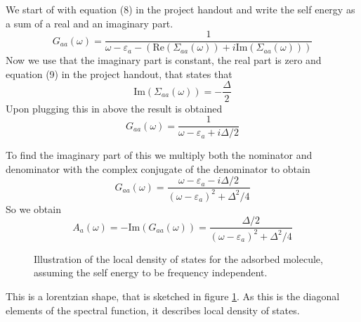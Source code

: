 \begin{solution}
We start of with equation (8) in the project handout and write the self energy as a sum of a real and an imaginary part.
\begin{equation}
    G_{aa}(\omega) = \frac{1}{\omega - \varepsilon_a-(\mathrm{Re}(\Sigma_{aa}(\omega)) + i \mathrm{Im}(\Sigma_{aa}(\omega)))}
\end{equation}
Now we use that the imaginary part is constant, the real part is zero and equation (9) in the project handout, that states that
\begin{equation}
    \mathrm{Im}(\Sigma_{aa}(\omega)) = -\frac{\Delta}{2}
\end{equation}
Upon plugging this in above the result is obtained
\begin{equation}
        G_{aa}(\omega) = \frac{1}{\omega - \varepsilon_a + i \Delta/2}
\end{equation}

To find the imaginary part of this we multiply both the nominator and denominator with the complex conjugate of the denominator to obtain
\begin{equation}
    G_{aa}(\omega) = \frac{\omega - \varepsilon_a - i \Delta/2}{(\omega - \varepsilon_a)^2 + \Delta^2/4}
\end{equation}
So we obtain
\begin{equation}
    A_a(\omega) = - \mathrm{Im}(G_{aa}(\omega)) = \frac{\Delta/2}{(\omega - \varepsilon_a)^2 + \Delta^2/4}
\end{equation}

\begin{figure}[!ht]
    \centering
    \caption{Illustration of the local density of states for the adsorbed molecule, assuming the self energy to be frequency independent.}
    \label{fig:DOSNEWNS}
\end{figure}
This is a lorentzian shape, that is sketched in figure \ref{fig:DOSNEWNS}. As this is the diagonal elements of the spectral function, it describes local density of states.
\end{solution}






